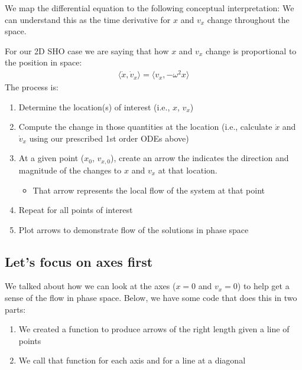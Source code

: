 \documentclass[letterpaper,10pt,english]{jupyterBook}
\begin{document}
\sphinxAtStartPar
We map the differential equation to the following conceptual interpretation:  We can understand this as the time derivative for \(x\) and \(v_x\) change throughout the space.

\sphinxAtStartPar
For our 2D SHO case we are saying that how \(x\) and \(v_x\) change is proportional to the position in space:
\begin{equation*}
\begin{split}\langle \dot{x}, \dot{v}_x \rangle = \langle v_x, -\omega^2 x\rangle\end{split}
\end{equation*}
\sphinxAtStartPar
The process is:
\begin{enumerate}
%
\item {} 
\sphinxAtStartPar
Determine the location(s) of interest (i.e., \(x\), \(v_x\))

\item {} 
\sphinxAtStartPar
Compute the change in those quantities at the location (i.e., calculate \(\dot{x}\) and \(\dot{v}_x\) using our prescribed 1st order ODEs above)

\item {} 
\sphinxAtStartPar
At a given point (\(x_0\), \(v_{x,0}\)), create an arrow the indicates the direction and magnitude of the changes to \(x\) and \(v_x\) at that location.
\begin{itemize}
\item {} 
\sphinxAtStartPar
That arrow represents the local flow of the system at that point

\end{itemize}

\item {} 
\sphinxAtStartPar
Repeat for all points of interest

\item {} 
\sphinxAtStartPar
Plot arrows to demonstrate flow of the solutions in phase space

\end{enumerate}


\subsection{Let’s focus on axes first}
\label{\detokenize{content/1_mechanics/dynamical_1:let-s-focus-on-axes-first}}
\sphinxAtStartPar
We talked about how we can look at the axes (\(x=0\) and \(v_x =0\)) to help get a sense of the flow in phase space. Below, we have some code that does this in two parts:
\begin{enumerate}
%
\item {} 
\sphinxAtStartPar
We created a function to produce arrows of the right length given a line of points

\item {} 
\sphinxAtStartPar
We call that function for each axis and for a line at a diagonal

\end{enumerate}
\end{document}
